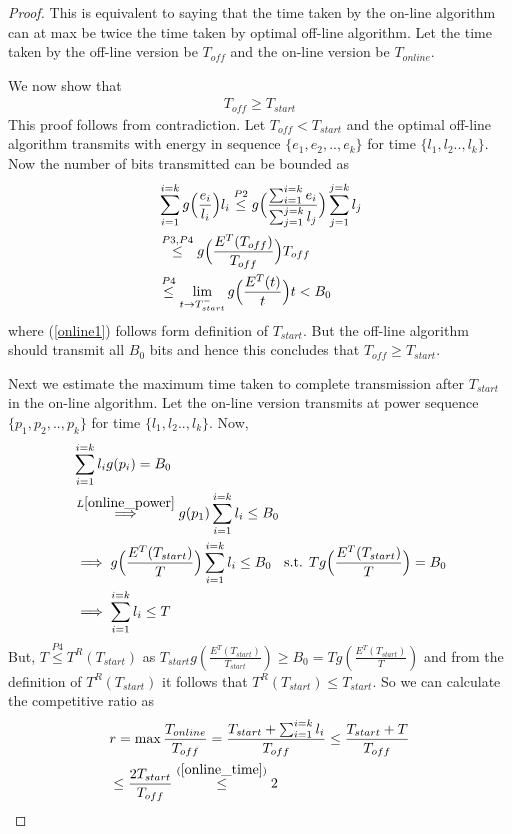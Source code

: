 \begin{proof}
This is equivalent to saying that the time taken by the on-line algorithm can at max be twice the time taken by optimal off-line algorithm. Let the time taken by the off-line version be $T_{off}$ and the on-line version be $T_{online}$. 

We now show that 
\begin{align}
T_{off}\ge T_{start}
\label{online_time}
\end{align}
This proof follows from contradiction. Let $T_{off}<T_{start}$ and the optimal off-line algorithm transmits with energy in sequence $\{e_1,e_2,..,e_k\}$ for time $\{l_1,l_2..,l_k\} $. Now the number of bits transmitted can be bounded as
\begin{align}
&\sum_{i=1}^{i=k} g\Big{(}\frac{e_i}{l_i}\Big{)}l_i\stackrel{P2}{\le} g\Big{(}\frac{\sum_{i=1}^{i=k}e_i}{\sum_{j=1}^{j=k}l_j}\Big{)} \sum_{j=1}^{j=k} l_j 
\\
&\stackrel{P3,P4}{\le} g\Big{(}\frac{E^T(T_{off})}{T_{off}}\Big{)} T_{off}
\\
&\stackrel{P4}{\le}\lim_{t \rightarrow T_{start}^{-}} g\Big{(}\frac{E^T(t)}{t}\Big{)} t < B_0 \label{online1}
\end{align}
where (\ref{online1}) follows form definition of $T_{start}$. But the off-line algorithm should transmit all $B_0$ bits and hence this concludes that $T_{off}\ge T_{start}$.

Next we estimate the maximum time taken to complete transmission after $T_{start}$ in the on-line algorithm. Let the on-line version transmits at power sequence $\{p_1,p_2,..,p_k\}$ for time $\{l_1,l_2..,l_k\} $. Now,
\begin{align}
&\sum_{i=1}^{i=k}l_ig(p_i)=B_0
\\
&\stackrel{L\ref{online_power}}{\implies}g(p_1)\sum_{i=1}^{i=k}l_i\le B_0
\\
&\implies g\Big{(}\frac{E^T(T_{start})}{T}\Big{)}\sum_{i=1}^{i=k}l_i\le B_0 \text{\hspace{2mm}  s.t. } Tg\Big{(}\frac{E^T(T_{start})}{T}\Big{)}=B_0
\\
&\implies \sum_{i=1}^{i=k}l_i \le T
\end{align}
But, $T\stackrel{P4}{\le} T^R(T_{start})$ as $T_{start}g(\frac{E^T(T_{start})}{T_{start}})\ge B_0=Tg(\frac{E^T(T_{start})}{T})$ and from the definition of $T^R(T_{start})$ it follows that $T^R(T_{start})\le T_{start}$. So we can calculate the competitive ratio as
\begin{align}
&r=\max\dfrac{T_{online}}{T_{off}} = \dfrac{T_{start}+\sum_{i=1}^{i=k}l_i}{T_{off}} \le  \dfrac{T_{start}+T}{T_{off}} 
\\
&\le \dfrac{2 T_{start}}{T_{off}} \stackrel{(\ref{online_time})}{\le} 2
\end{align}      
\end{proof}
